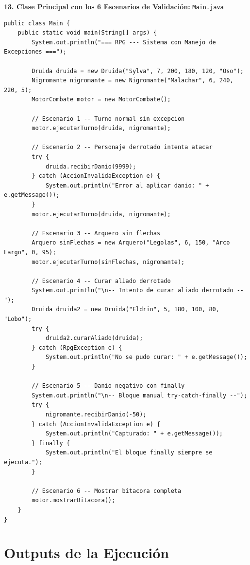 \documentclass[11pt,letterpaper]{article}
\begin{document}
\textbf{13. Clase Principal con los 6 Escenarios de Validación:} \texttt{Main.java}
\begin{lstlisting}[style=JavaStyle]
public class Main {
    public static void main(String[] args) {
        System.out.println("=== RPG --- Sistema con Manejo de Excepciones ===");

        Druida druida = new Druida("Sylva", 7, 200, 180, 120, "Oso");
        Nigromante nigromante = new Nigromante("Malachar", 6, 240, 220, 5);
        MotorCombate motor = new MotorCombate();

        // Escenario 1 -- Turno normal sin excepcion
        motor.ejecutarTurno(druida, nigromante);

        // Escenario 2 -- Personaje derrotado intenta atacar
        try {
            druida.recibirDanio(9999);
        } catch (AccionInvalidaException e) {
            System.out.println("Error al aplicar danio: " + e.getMessage());
        }
        motor.ejecutarTurno(druida, nigromante);

        // Escenario 3 -- Arquero sin flechas
        Arquero sinFlechas = new Arquero("Legolas", 6, 150, "Arco Largo", 0, 95);
        motor.ejecutarTurno(sinFlechas, nigromante);

        // Escenario 4 -- Curar aliado derrotado
        System.out.println("\n-- Intento de curar aliado derrotado --");
        Druida druida2 = new Druida("Eldrin", 5, 180, 100, 80, "Lobo");
        try {
            druida2.curarAliado(druida);
        } catch (RpgException e) {
            System.out.println("No se pudo curar: " + e.getMessage());
        }

        // Escenario 5 -- Danio negativo con finally
        System.out.println("\n-- Bloque manual try-catch-finally --");
        try {
            nigromante.recibirDanio(-50);
        } catch (AccionInvalidaException e) {
            System.out.println("Capturado: " + e.getMessage());
        } finally {
            System.out.println("El bloque finally siempre se ejecuta.");
        }

        // Escenario 6 -- Mostrar bitacora completa
        motor.mostrarBitacora();
    }
}
\end{lstlisting}

\section{Outputs de la Ejecución}
\end{document}
